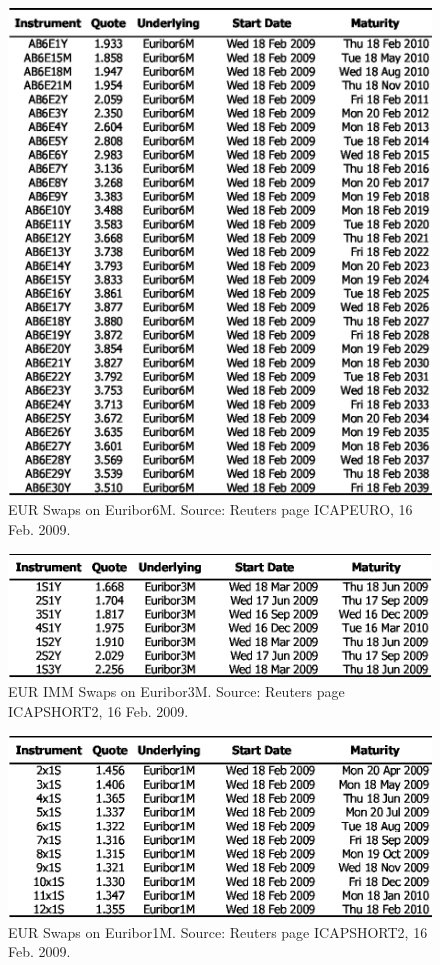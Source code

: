 \documentclass[11pt,reqno]{amsart}
\begin{document}
\begin{figure}[tbp]
\centering
\includegraphics[scale=0.9]{./FigMktSwaps6M}
\caption{EUR Swaps on Euribor6M. Source: Reuters page ICAPEURO, 16 Feb. 2009.}
\label{fig:Swaps6M}
\end{figure}

\begin{figure}[tbp]
\centering
\includegraphics[scale=0.9]{./FigMktSwapsIMM}
\caption{EUR IMM Swaps on Euribor3M. Source: Reuters page ICAPSHORT2, 16 Feb. 2009.}
\label{fig:SwapsIMM}
\end{figure}

\begin{figure}[tbp]
\centering
\includegraphics[scale=0.9]{./FigMktSwaps1M}
\caption{EUR Swaps on Euribor1M. Source: Reuters page ICAPSHORT2, 16 Feb. 2009.}
\label{fig:Swaps1M}
\end{figure}
\end{document}
